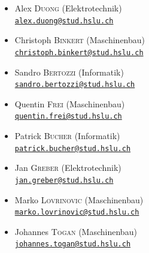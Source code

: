 \begin{multicols}{2}
\begin{itemize}
    \item Alex \textsc{Duong} (Elektrotechnik)\\ \href{mailto:alex.duong@stud.hslu.ch}{\texttt{alex.duong@stud.hslu.ch}}
    \item Christoph \textsc{Binkert} (Maschinenbau)\\ \href{mailto:christoph.binkert@stud.hslu.ch}{\texttt{christoph.binkert@stud.hslu.ch}}
    \item Sandro \textsc{Bertozzi} (Informatik)\\ \href{mailto:sandro.bertozzi@stud.hslu.ch}{\texttt{sandro.bertozzi@stud.hslu.ch}}
    \item Quentin \textsc{Frei} (Maschinenbau)\\ \href{mailto:quentin.frei@stud.hslu.ch}{\texttt{quentin.frei@stud.hslu.ch}}
\end{itemize}
\columnbreak
\begin{itemize}
    \item Patrick \textsc{Bucher} (Informatik)\\ \href{mailto:patrick.bucher@stud.hslu.ch}{\texttt{patrick.bucher@stud.hslu.ch}}
    \item Jan \textsc{Greber} (Elektrotechnik)\\ \href{mailto:jan.greber@stud.hslu.ch}{\texttt{jan.greber@stud.hslu.ch}}
    \item Marko \textsc{Lovrinovic} (Maschinenbau)\\ \href{mailto:marko.lovrinovic@stud.hslu.ch}{\texttt{marko.lovrinovic@stud.hslu.ch}}\
    \item Johannes \textsc{Togan} (Maschinenbau)\\ \href{mailto:johannes.togan@stud.hslu.ch}{\texttt{johannes.togan@stud.hslu.ch}} 
\end{itemize}
\end{multicols}
